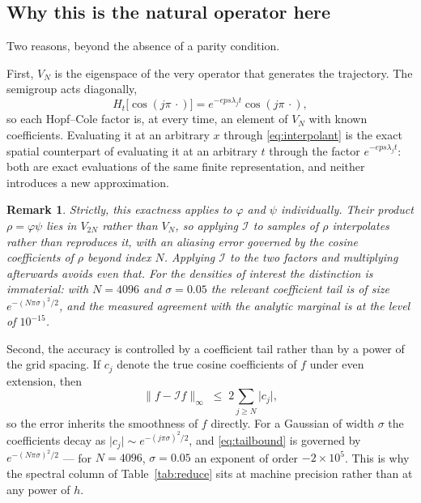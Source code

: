 \documentclass[11pt]{article}
\newtheorem{remark}{Remark}
\newcommand{\eps}{\varepsilon}
\newcommand{\dt}{\Delta t}
\newcommand{\dx}{\Delta x}
\newcommand{\code}[1]{\texttt{#1}}
\def\eps{eps}\def\dt{dt}\def\dx{dx}\def\code#1{#1}%
\begin{document}
\subsection{Why this is the natural operator here}

Two reasons, beyond the absence of a parity condition.

First, $V_N$ is the eigenspace of the very operator that generates the
trajectory. The semigroup acts diagonally,
\begin{equation}
  H_t\bigl[\cos(j\pi\,\cdot)\bigr] = e^{-\eps\lambda_j t}\cos(j\pi\,\cdot),
\end{equation}
so each Hopf--Cole factor is, at every time, an element of $V_N$ with known
coefficients. Evaluating it at an arbitrary $x$ through \eqref{eq:interpolant}
is the exact spatial counterpart of evaluating it at an arbitrary $t$ through
the factor $e^{-\eps\lambda_j t}$: both are exact evaluations of the same finite
representation, and neither introduces a new approximation.

\begin{remark}
Strictly, this exactness applies to $\varphi$ and $\psi$ individually. Their
product $\rho=\varphi\psi$ lies in $V_{2N}$ rather than $V_N$, so applying
$\mathcal{I}$ to samples of $\rho$ interpolates rather than reproduces it, with
an aliasing error governed by the cosine coefficients of $\rho$ beyond index
$N$. Applying $\mathcal{I}$ to the two factors and multiplying afterwards avoids
even that. For the densities of interest the distinction is immaterial: with
$N=4096$ and $\sigma=0.05$ the relevant coefficient tail is of size
$e^{-(N\pi\sigma)^2/2}$, and the measured agreement with the analytic marginal
is at the level of $10^{-15}$.
\end{remark}

Second, the accuracy is controlled by a coefficient tail rather than by a power
of the grid spacing. If $c_j$ denote the true cosine coefficients of $f$ under
even extension, then
\begin{equation}
  \bigl\|f-\mathcal{I}f\bigr\|_\infty \;\le\; 2\sum_{j\ge N}\lvert c_j\rvert ,
  \label{eq:tailbound}
\end{equation}
so the error inherits the smoothness of $f$ directly. For a Gaussian of width
$\sigma$ the coefficients decay as
$\lvert c_j\rvert\sim e^{-(j\pi\sigma)^2/2}$, and \eqref{eq:tailbound} is
governed by $e^{-(N\pi\sigma)^2/2}$ --- for $N=4096$, $\sigma=0.05$ an exponent
of order $-2\times10^{5}$. This is why the spectral column of
Table~\ref{tab:reduce} sits at machine precision rather than at any power of
$h$.
\end{document}
